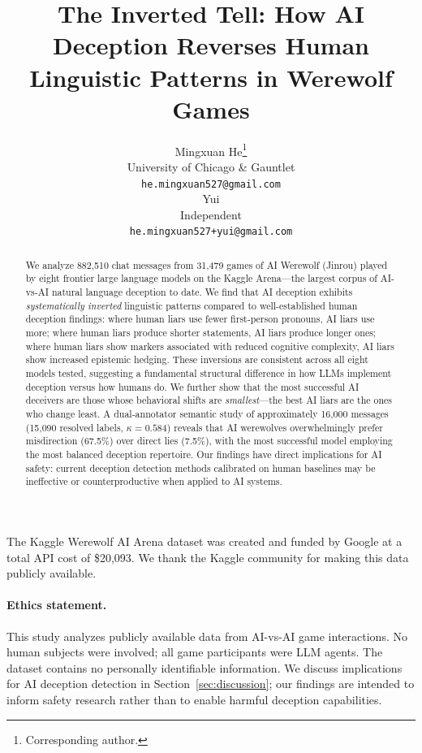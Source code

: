 \documentclass{article}
\title{The Inverted Tell: How AI Deception Reverses Human Linguistic Patterns in Werewolf Games}
\author{%
  Mingxuan He\thanks{Corresponding author.} \\
  University of Chicago \& Gauntlet \\
  \texttt{he.mingxuan527@gmail.com} \\
  \And
  Yui \\
  Independent \\
  \texttt{he.mingxuan527+yui@gmail.com} \\
}
\begin{document}
\maketitle

\begin{abstract}
We analyze 882,510 chat messages from 31,479 games of AI Werewolf (Jinrou) played by eight frontier large language models on the Kaggle Arena---the largest corpus of AI-vs-AI natural language deception to date. We find that AI deception exhibits \emph{systematically inverted} linguistic patterns compared to well-established human deception findings: where human liars use fewer first-person pronouns, AI liars use more; where human liars produce shorter statements, AI liars produce longer ones; where human liars show markers associated with reduced cognitive complexity, AI liars show increased epistemic hedging. These inversions are consistent across all eight models tested, suggesting a fundamental structural difference in how LLMs implement deception versus how humans do. We further show that the most successful AI deceivers are those whose behavioral shifts are \emph{smallest}---the best AI liars are the ones who change least. A dual-annotator semantic study of approximately 16{,}000 messages (15{,}090 resolved labels, $\kappa=0.584$) reveals that AI werewolves overwhelmingly prefer misdirection (67.5\%) over direct lies (7.5\%), with the most successful model employing the most balanced deception repertoire. Our findings have direct implications for AI safety: current deception detection methods calibrated on human baselines may be ineffective or counterproductive when applied to AI systems.
\end{abstract}










\begin{ack}
The Kaggle Werewolf AI Arena dataset was created and funded by Google at a total API cost of \$20,093. We thank the Kaggle community for making this data publicly available.
\end{ack}

\paragraph{Ethics statement.} This study analyzes publicly available data from AI-vs-AI game interactions. No human subjects were involved; all game participants were LLM agents. The dataset contains no personally identifiable information. We discuss implications for AI deception detection in Section~\ref{sec:discussion}; our findings are intended to inform safety research rather than to enable harmful deception capabilities.




\newpage
\appendix

\end{document}
